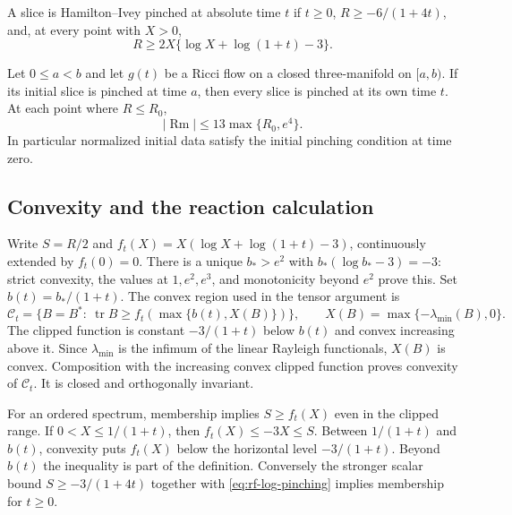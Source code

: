 \begin{definition}\label{def:rf-pinched}
A slice is Hamilton--Ivey pinched at absolute time $t$ if $t\geq0$,
$R\geq-6/(1+4t)$, and, at every point with $X>0$,
\begin{equation}\label{eq:rf-log-pinching}
                  R\geq2X\{\log X+\log(1+t)-3\}.
\end{equation}
\end{definition}

\begin{theorem}\label{thm:rf-pinching}
Let $0\leq a<b$ and let $g(t)$ be a Ricci flow on a closed
three-manifold on $[a,b)$.  If its initial slice is pinched at time $a$,
then every slice is pinched at its own time $t$.
At each point where $R\leq R_0$,
\begin{equation}\label{eq:rf-full-bound}
             |\operatorname{Rm}|\leq13\max\{R_0,e^4\}.
\end{equation}
In particular normalized initial data satisfy the initial pinching
condition at time zero.
\end{theorem}

\subsection{Convexity and the reaction calculation}

Write $S=R/2$ and $f_t(X)=X(\log X+\log(1+t)-3)$, continuously extended
by $f_t(0)=0$.  There is a unique $b_*>e^2$ with
$b_*(\log b_*-3)=-3$: strict convexity, the values at $1,e^2,e^3$,
and monotonicity beyond $e^2$ prove this.  Set $b(t)=b_* /(1+t)$.
The convex region used in the tensor argument is
\[
 \mathcal C_t=\{B=B^*:\
       \operatorname{tr}B\geq f_t(\max\{b(t),X(B)\})\},\qquad
 X(B)=\max\{-\lambda_{\min}(B),0\}.
\]
The clipped function is constant $-3/(1+t)$ below $b(t)$ and convex
increasing above it.  Since $\lambda_{\min}$ is the infimum of the
linear Rayleigh functionals, $X(B)$ is convex.  Composition with the
increasing convex clipped function proves convexity of $\mathcal C_t$.
It is closed and orthogonally invariant.

For an ordered spectrum, membership implies $S\geq f_t(X)$ even in the
clipped range.  If $0<X\leq1/(1+t)$, then $f_t(X)\leq-3X\leq S$.
Between $1/(1+t)$ and $b(t)$, convexity puts $f_t(X)$ below the
horizontal level $-3/(1+t)$.  Beyond $b(t)$ the inequality is part of
the definition.  Conversely the stronger scalar bound
$S\geq-3/(1+4t)$ together with \eqref{eq:rf-log-pinching} implies
membership for $t\geq0$.


